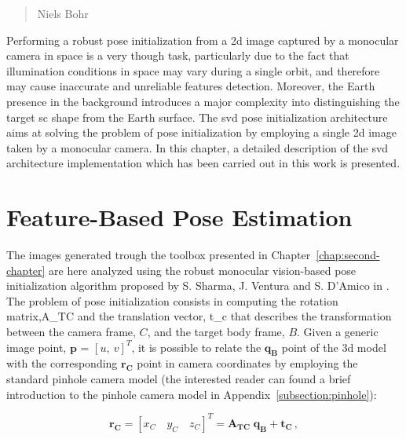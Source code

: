 \begin{quotation}
  {\footnotesize
    \begin{flushright}
      Niels Bohr
    \end{flushright}
  }
\end{quotation}
\vspace{0.5cm}

Performing a robust pose initialization from a \acrshort{2d} image captured by a monocular camera in space is a very though task, particularly due to the fact that illumination conditions in space may vary during a single orbit, and therefore may cause inaccurate and unreliable features detection. Moreover, the Earth presence in the background introduces a major complexity into distinguishing the target \acrshort{sc} shape from the Earth surface. The \acrshort{svd} pose initialization architecture aims at solving the problem of pose initialization by employing a single \acrshort{2d} image taken by a monocular camera. In this chapter, a detailed description of the \acrshort{svd} architecture implementation which has been carried out in this work is presented.

\section{Feature-Based Pose Estimation}
The images generated  trough the toolbox presented in Chapter~\ref{chap:second-chapter} are here analyzed using the robust monocular vision-based pose initialization algorithm proposed by S. Sharma, J. Ventura and S. D'Amico in \cite{Sharma2018}.
The problem of pose initialization consists in computing the rotation matrix,\gls{A_TC} and the translation vector, \gls{t_c} that describes the transformation between the camera frame, $C$, and the target body frame, $B$. Given a generic image point, $\mathbf{p}$ = $ [u, \ v]^T $, it is possible to relate the $\mathbf{q_B}$ point of the \acrshort{3d} model with the corresponding $\mathbf{r_C}$ point in camera coordinates by employing the standard pinhole camera model (the interested reader can found a brief introduction to the pinhole camera model in Appendix~\ref{subsection:pinhole}):

\begin{equation}
  \mathbf{r_C} = \left[x_C \quad  y_C \quad z_C\right]^T = \mathbf{A_{TC}} \; \mathbf{q_B} + \mathbf{t_C} \,,
  \label{eq:rc}
\end{equation}

